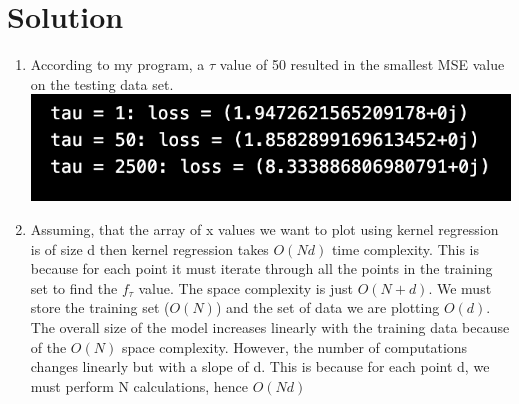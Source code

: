 \documentclass[submit]{harvardml}
\newenvironment{solution}
  {\color{blue}\section*{Solution}}
{}
\begin{document}
\begin{solution}
\begin{enumerate}
        \item According to my program, a $\tau$ value of 50 resulted in the smallest MSE value on the testing data set.
        \includegraphics[width=\textwidth]{q2.4.png}
        \item Assuming, that the array of x values we want to plot using kernel regression is of size d then kernel regression takes $O(Nd)$ time complexity. This is because for each point it must iterate through all the points in the training set to find the $f_{\tau}$ value. The space complexity is just $O(N + d)$. We must store the training set ($O(N)$) and the set of data we are plotting $O(d)$. The overall size of the model increases linearly with the training data because of the $O(N)$ space complexity. However, the number of computations changes linearly but with a slope of d. This is because for each point d, we must perform N calculations, hence $O(Nd)$
	\end{enumerate}
\end{solution}


\newpage
\end{document}
